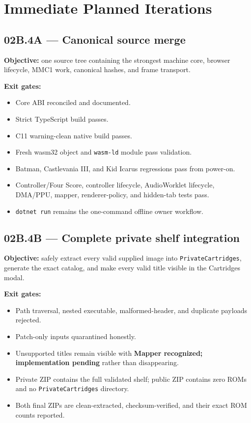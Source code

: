 \documentclass[10pt,letterpaper]{article}
\newcommand{\code}[1]{\texttt{\small #1}}
\begin{document}
\section{Immediate Planned Iterations}

\subsection{02B.4A --- Canonical source merge}
\textbf{Objective:} one source tree containing the strongest machine core, browser lifecycle, MMC1 work, canonical hashes, and frame transport.

\textbf{Exit gates:}
\begin{itemize}
\item Core ABI reconciled and documented.
\item Strict TypeScript build passes.
\item C11 warning-clean native build passes.
\item Fresh wasm32 object and \code{wasm-ld} module pass validation.
\item Batman, Castlevania III, and Kid Icarus regressions pass from power-on.
\item Controller/Four Score, controller lifecycle, AudioWorklet lifecycle, DMA/PPU, mapper, renderer-policy, and hidden-tab tests pass.
\item \code{dotnet run} remains the one-command offline owner workflow.
\end{itemize}

\subsection{02B.4B --- Complete private shelf integration}
\textbf{Objective:} safely extract every valid supplied image into \code{PrivateCartridges}, generate the exact catalog, and make every valid title visible in the Cartridges modal.

\textbf{Exit gates:}
\begin{itemize}
\item Path traversal, nested executable, malformed-header, and duplicate payloads rejected.
\item Patch-only inputs quarantined honestly.
\item Unsupported titles remain visible with \textbf{Mapper recognized; implementation pending} rather than disappearing.
\item Private ZIP contains the full validated shelf; public ZIP contains zero ROMs and no \code{PrivateCartridges} directory.
\item Both final ZIPs are clean-extracted, checksum-verified, and their exact ROM counts reported.
\end{itemize}
\end{document}
